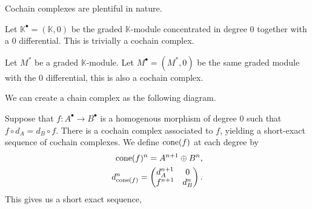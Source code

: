 \documentclass[../thesis.tex]{subfiles}
\begin{document}
            Cochain complexes are plentiful in nature.
            \begin{example}
                Let $\mathbb{K}^\bullet = (\mathbb{K}, 0)$ be the graded $\mathbb{K}$-module concentrated in degree $0$ together with a $0$ differential. This is trivially a cochain complex.
            \end{example}
            \begin{example}
                Let $M^*$ be a graded $\mathbb{K}$-module. Let $M^\bullet = (M^*, 0)$ be the same graded module with the $0$ differential, this is also a cochain complex.
            \end{example}
            \begin{example}
                We can create a chain complex as the following diagram.
                \begin{center}
                \end{center}
            \end{example}
            \begin{example}
                Suppose that $f : A^\bullet \rightarrow B^\bullet$ is a homogenous morphism of degree $0$ such that $f\circ d_A = d_B\circ f$. There is a cochain complex associated to $f$, yielding a short-exact sequence of cochain complexes. We define $\tt{cone}(f)$ at each degree by
                \begin{align*}
                    \tt{cone}(f)^n = A^{n+1} \oplus B^{n}\tt{,} \\
                    d_{\tt{cone}(f)}^n = \begin{pmatrix}
                        d_A^{n+1} & 0 \\ f^{n+1} & d_B^n
                    \end{pmatrix}\tt{.}
                \end{align*}
                This gives us a short exact sequence,
                \begin{center}
                \end{center}
            \end{example}
\end{document}
